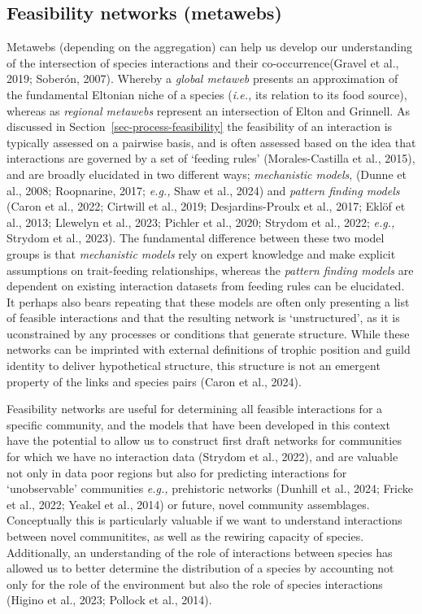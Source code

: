 \documentclass[
]{article}
\begin{document}
\subsection{Feasibility networks
(metawebs)}\label{feasibility-networks-metawebs}

Metawebs (depending on the aggregation) can help us develop our
understanding of the intersection of species interactions and their
co-occurrence(Gravel et al., 2019; Soberón, 2007). Whereby a
\emph{global metaweb} presents an approximation of the fundamental
Eltonian niche of a species (\emph{i.e.,} its relation to its food
source), whereas as \emph{regional metawebs} represent an intersection
of Elton and Grinnell. As discussed in
Section~\ref{sec-process-feasibility} the feasibility of an interaction
is typically assessed on a pairwise basis, and is often assessed based
on the idea that interactions are governed by a set of `feeding rules'
(Morales-Castilla et al., 2015), and are broadly elucidated in two
different ways; \emph{mechanistic models}, (Dunne et al., 2008;
Roopnarine, 2017; \emph{e.g.,} Shaw et al., 2024) and \emph{pattern
finding models} (Caron et al., 2022; Cirtwill et al., 2019;
Desjardins-Proulx et al., 2017; Eklöf et al., 2013; Llewelyn et al.,
2023; Pichler et al., 2020; Strydom et al., 2022; \emph{e.g.,} Strydom
et al., 2023). The fundamental difference between these two model groups
is that \emph{mechanistic models} rely on expert knowledge and make
explicit assumptions on trait-feeding relationships, whereas the
\emph{pattern finding models} are dependent on existing interaction
datasets from feeding rules can be elucidated. It perhaps also bears
repeating that these models are often only presenting a list of feasible
interactions and that the resulting network is `unstructured', as it is
uconstrained by any processes or conditions that generate structure.
While these networks can be imprinted with external definitions of
trophic position and guild identity to deliver hypothetical structure,
this structure is not an emergent property of the links and species
pairs (Caron et al., 2024).

Feasibility networks are useful for determining all feasible
interactions for a specific community, and the models that have been
developed in this context have the potential to allow us to construct
first draft networks for communities for which we have no interaction
data (Strydom et al., 2022), and are valuable not only in data poor
regions but also for predicting interactions for `unobservable'
communities \emph{e.g.,} prehistoric networks (Dunhill et al., 2024;
Fricke et al., 2022; Yeakel et al., 2014) or future, novel community
assemblages. Conceptually this is particularly valuable if we want to
understand interactions between novel communitites, as well as the
rewiring capacity of species. Additionally, an understanding of the role
of interactions between species has allowed us to better determine the
distribution of a species by accounting not only for the role of the
environment but also the role of species interactions (Higino et al.,
2023; Pollock et al., 2014).
\end{document}
